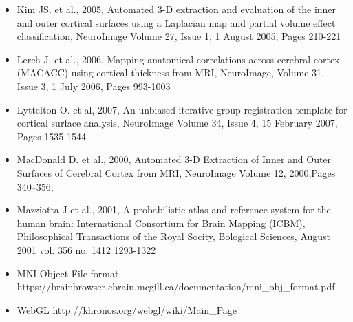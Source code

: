 \documentclass[a4shrink]{baposter}
\begin{document}
\begin{poster}
{  \begin{itemize} 
    \item \tiny Kim JS. et al., 2005, Automated 3-D extraction and evaluation of the inner and outer cortical surfaces using a Laplacian map and partial volume effect classification, NeuroImage Volume 27, Issue 1, 1 August 2005, Pages 210-221
    \item \tiny Lerch J. et al.,  2006,  Mapping anatomical correlations across cerebral cortex (MACACC) using cortical thickness from MRI, NeuroImage, Volume 31, Issue 3, 1 July 2006, Pages 993-1003
    \item \tiny Lyttelton O. et al, 2007, An unbiased iterative group registration template for cortical surface analysis, NeuroImage Volume 34, Issue 4, 15 February 2007, Pages 1535-1544
    \item \tiny MacDonald D. et al., 2000,  Automated 3-D Extraction of Inner and Outer Surfaces of Cerebral Cortex from MRI, NeuroImage Volume 12, 2000,Pages 340–356, 
    \item \tiny Mazziotta J et al., 2001, A probabilistic atlas and reference system for the human brain: International Consortium for Brain Mapping (ICBM), Philosophical Transactions of the Royal Socity, Bological Sciences, August 2001 vol. 356 no. 1412 1293-1322
    \item \tiny MNI Object File format https://brainbrowser.cbrain.mcgill.ca/documentation/mni\_obj\_format.pdf
    \item \tiny WebGL http://khronos.org/webgl/wiki/Main\_Page
  \end{itemize}
}

\end{poster}
\end{document}
